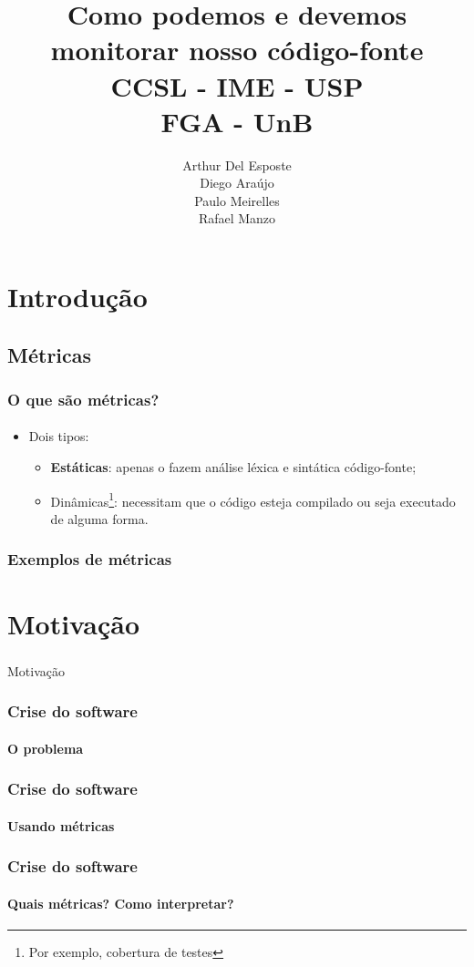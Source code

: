 \documentclass{beamer}
\title{
       \textbf{Como podemos e devemos monitorar nosso código-fonte} \\
       CCSL - IME - USP\\
       FGA - UnB
      }
\author{
        Arthur Del Esposte \\
        Diego Araújo \\
        Paulo Meirelles \\
        Rafael Manzo
       }
\begin{document}
\maketitle

\section{Introdução}
  \subsection{Métricas}
  \begin{frame}
    \frametitle{O que são métricas?}
    \framesubtitle{}

    \begin{itemize}
      
      \item Dois tipos:
        \begin{itemize}
          \item \textbf{Estáticas}: apenas o fazem análise léxica e sintática código-fonte;
          \item Dinâmicas\footnote{Por exemplo, cobertura de testes}: necessitam que o código esteja compilado ou seja executado de alguma forma.
        \end{itemize}
    \end{itemize}
  \end{frame}

  \begin{frame}
    \frametitle{Exemplos de métricas}
    \framesubtitle{}
  \end{frame}

\section{Motivação}
\begin{frame}
  \frametitle{}
  \framesubtitle{}

  Motivação
\end{frame}

\begin{frame}
  \frametitle{Crise do software}
  \framesubtitle{O problema}
\end{frame}

\begin{frame}
  \frametitle{Crise do software}
  \framesubtitle{Usando métricas}
\end{frame}

\begin{frame}
  \frametitle{Crise do software}
  \framesubtitle{Quais métricas? Como interpretar?}
\end{frame}
\end{document}
